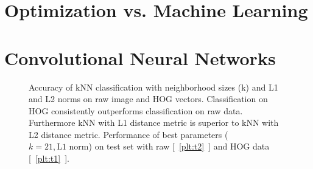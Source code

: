 \section{Optimization vs. Machine Learning}

\section{Convolutional Neural Networks}

\begin{figure}[h!t]
\newcommand{\plotref}[1]{{[~\ref{plt:#1}~]}}
\centering

\caption{Accuracy of kNN classification with neighborhood sizes (k) and L1 and L2 norms on raw image and HOG vectors. Classification on HOG consistently outperforms classification on raw data. Furthermore kNN with L1 distance metric is superior to kNN with L2 distance metric. Performance of best parameters ($k=21, \text{L1 norm}$) on test set with raw \plotref{t2} and HOG data \plotref{t1}. }
\label{figparam}

\end{figure}








